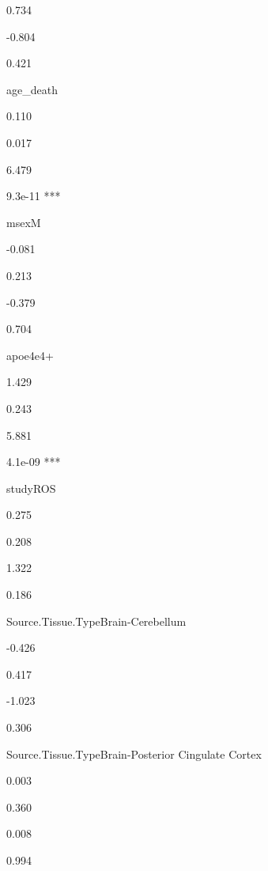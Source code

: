 \documentclass[]{book}
\begin{document}
0.734

-0.804

0.421

age\_death

0.110

0.017

6.479

9.3e-11 ***

msexM

-0.081

0.213

-0.379

0.704

apoe4e4+

1.429

0.243

5.881

4.1e-09 ***

studyROS

0.275

0.208

1.322

0.186

Source.Tissue.TypeBrain-Cerebellum

-0.426

0.417

-1.023

0.306

Source.Tissue.TypeBrain-Posterior Cingulate Cortex

0.003

0.360

0.008

0.994
\end{document}
